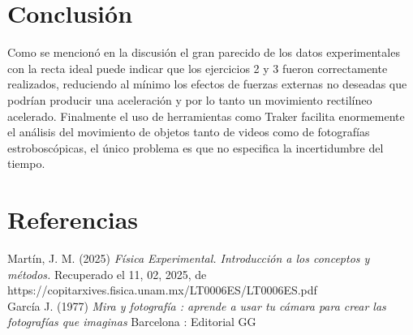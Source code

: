 \documentclass[12pt,a4paper]{article}
\begin{document}
\section{Conclusión}

Como se mencionó en la discusión el gran parecido de los datos experimentales con la recta ideal puede indicar que los ejercicios 2 y 3 fueron correctamente realizados, reduciendo al mínimo los efectos de fuerzas externas no deseadas que podrían producir una aceleración y por lo tanto un movimiento rectilíneo acelerado. 
 Finalmente el uso de herramientas como Traker facilita enormemente el análisis del movimiento de objetos tanto de videos como de fotografías estroboscópicas, el único problema es que no especifica la incertidumbre del tiempo. 


\section{Referencias}

Martín, J. M. (2025) \textit{Física Experimental. Introducción a los conceptos y métodos.} Recuperado el 11, 02, 2025, de https://copitarxives.fisica.unam.mx/LT0006ES/LT0006ES.pdf \\

García J. (1977)  \textit{Mira y fotografía :   aprende a usar tu cámara para crear las fotografías que imaginas} Barcelona :   Editorial GG\\
\end{document}
